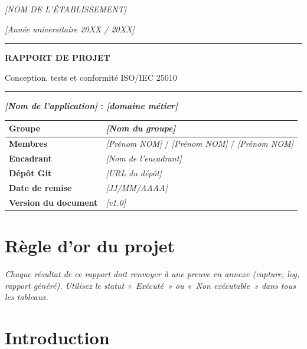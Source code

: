 \documentclass[11pt,a4paper]{article}
\newcommand{\ph}[1]{\textit{[#1]}}
\newcommand{\guide}[1]{\par{\small\itshape #1}\par\medskip}
\newcommand{\row}[2]{\textbf{#1} & #2 \\ \hline}
\begin{document}
\begin{titlepage}
\centering
\vspace*{1.5cm}
{\large \ph{NOM DE L'\'ETABLISSEMENT}\par}
{\large \ph{Ann\'ee universitaire 20XX / 20XX}\par}
\vspace{2.5cm}
\rule{\textwidth}{1.2pt}\par\vspace{0.6cm}
{\Huge\bfseries RAPPORT DE PROJET\par}
\vspace{0.4cm}
{\Large Conception, tests et conformit\'e ISO/IEC 25010\par}
\vspace{0.6cm}\rule{\textwidth}{1.2pt}\par
\vspace{1.8cm}
{\Large\bfseries \ph{Nom de l'application} : \ph{domaine m\'etier}\par}
\vspace{2cm}
\begin{tabularx}{\textwidth}{|L{4.2cm}|Y|}\hline
\row{Groupe}{\ph{Nom du groupe}}
\row{Membres}{\ph{Pr\'enom NOM} / \ph{Pr\'enom NOM} / \ph{Pr\'enom NOM}}
\row{Encadrant}{\ph{Nom de l'encadrant}}
\row{D\'ep\^ot Git}{\ph{URL du d\'ep\^ot}}
\row{Date de remise}{\ph{JJ/MM/AAAA}}
\row{Version du document}{\ph{v1.0}}
\end{tabularx}
\end{titlepage}

\tableofcontents
\newpage

\section*{R\`egle d'or du projet}
\guide{Chaque r\'esultat de ce rapport doit renvoyer \`a une preuve en annexe (capture, log, rapport g\'en\'er\'e). Utilisez le statut «~Ex\'ecut\'e~» ou «~Non ex\'ecutable~» dans tous les tableaux.}

\section{Introduction}
\end{document}
